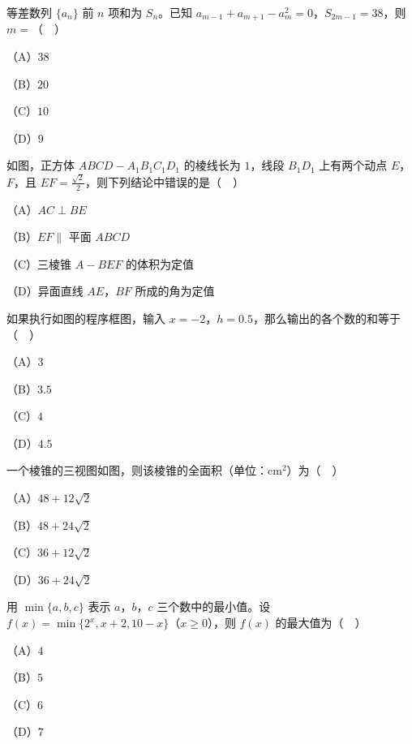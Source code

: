\begin{question}
等差数列 $\{a_n\}$ 前 $n$ 项和为 $S_n$。已知 $a_{m-1}+a_{m+1}-a_m^2=0$，$S_{2m-1}=38$，则 $m=$（　）

（A）$38$

（B）$20$

（C）$10$

（D）$9$

\Needspace{0.4\textheight}
\end{question}
\begin{question}
如图，正方体 $ABCD-A_1B_1C_1D_1$ 的棱线长为 $1$，线段 $B_1D_1$ 上有两个动点 $E$，$F$，且 $EF=\frac{\sqrt2}{2}$，则下列结论中错误的是（　）
\nopagebreak[4]
\begin{center}\end{center}
\nopagebreak[4]
（A）$AC\perp BE$

（B）$EF\parallel$ 平面 $ABCD$

（C）三棱锥 $A-BEF$ 的体积为定值

（D）异面直线 $AE$，$BF$ 所成的角为定值

\Needspace{0.4\textheight}
\end{question}
\begin{question}
如果执行如图的程序框图，输入 $x=-2$，$h=0.5$，那么输出的各个数的和等于（　）
\nopagebreak[4]
\begin{center}\end{center}
\nopagebreak[4]
（A）$3$

（B）$3.5$

（C）$4$

（D）$4.5$

\Needspace{0.4\textheight}
\end{question}
\begin{question}
一个棱锥的三视图如图，则该棱锥的全面积（单位：$\mathrm{cm}^2$）为（　）
\nopagebreak[4]
\begin{center}\end{center}
\nopagebreak[4]
（A）$48+12\sqrt2$

（B）$48+24\sqrt2$

（C）$36+12\sqrt2$

（D）$36+24\sqrt2$

\end{question}
\begin{question}
用 $\min\{a,b,c\}$ 表示 $a$，$b$，$c$ 三个数中的最小值。设 $f(x)=\min\{2^x,x+2,10-x\}$（$x\geqslant0$），则 $f(x)$ 的最大值为（　）

（A）$4$

（B）$5$

（C）$6$

（D）$7$

\end{question}

